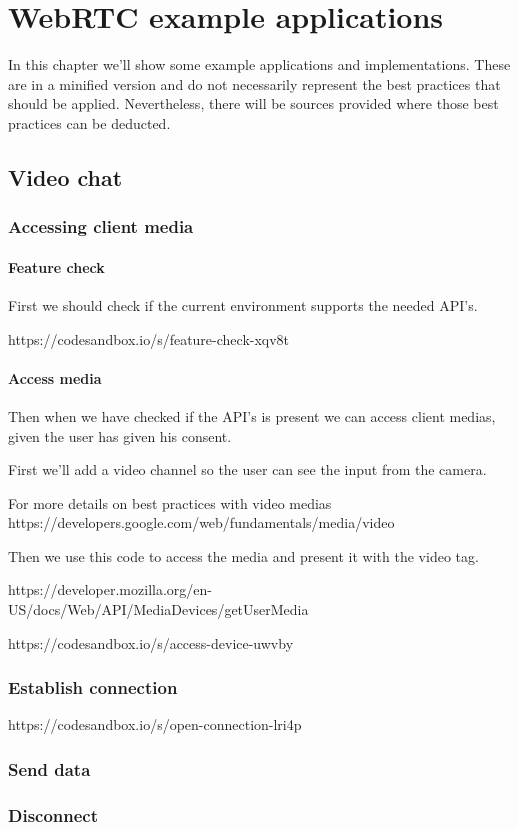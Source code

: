 \clearpage
\chapter{WebRTC example applications}
In this chapter we'll show some example applications and implementations. These are in a minified version and do not necessarily represent the best practices that should be applied. Nevertheless, there will be sources provided where those best practices can be deducted.

\section{Video chat}

\subsection{Accessing client media}

\subsubsection{Feature check}
First we should check if the current environment supports the needed API's.


https://codesandbox.io/s/feature-check-xqv8t

\subsubsection{Access media}
Then when we have checked if the API's is present we can access client medias, given the user has given his consent.

First we'll add a video channel so the user can see the input from the camera.

For more details on best practices with video medias https://developers.google.com/web/fundamentals/media/video

Then we use this code to access the media and present it with the video tag.

https://developer.mozilla.org/en-US/docs/Web/API/MediaDevices/getUserMedia

https://codesandbox.io/s/access-device-uwvby

\subsection{Establish connection}
https://codesandbox.io/s/open-connection-lri4p


\subsection{Send data}
\subsection{Disconnect}